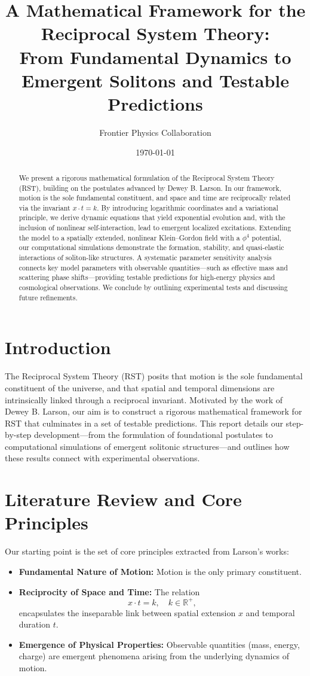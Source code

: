 \documentclass{article}
\title{A Mathematical Framework for the Reciprocal System Theory:\\ From Fundamental Dynamics to Emergent Solitons and Testable Predictions}
\author{Frontier Physics Collaboration}
\date{\today}
\begin{document}
\maketitle

\begin{abstract}
We present a rigorous mathematical formulation of the Reciprocal System Theory (RST), building on the postulates advanced by Dewey B. Larson. In our framework, motion is the sole fundamental constituent, and space and time are reciprocally related via the invariant \( x \cdot t = k \). By introducing logarithmic coordinates and a variational principle, we derive dynamic equations that yield exponential evolution and, with the inclusion of nonlinear self-interaction, lead to emergent localized excitations. Extending the model to a spatially extended, nonlinear Klein--Gordon field with a \(\phi^4\) potential, our computational simulations demonstrate the formation, stability, and quasi-elastic interactions of soliton-like structures. A systematic parameter sensitivity analysis connects key model parameters with observable quantities—such as effective mass and scattering phase shifts—providing testable predictions for high-energy physics and cosmological observations. We conclude by outlining experimental tests and discussing future refinements.
\end{abstract}

\tableofcontents

\section{Introduction}
The Reciprocal System Theory (RST) posits that motion is the sole fundamental constituent of the universe, and that spatial and temporal dimensions are intrinsically linked through a reciprocal invariant. Motivated by the work of Dewey B. Larson, our aim is to construct a rigorous mathematical framework for RST that culminates in a set of testable predictions. This report details our step-by-step development—from the formulation of foundational postulates to computational simulations of emergent solitonic structures—and outlines how these results connect with experimental observations.

\section{Literature Review and Core Principles}
Our starting point is the set of core principles extracted from Larson's works:
\begin{itemize}
    \item \textbf{Fundamental Nature of Motion:} Motion is the only primary constituent.
    \item \textbf{Reciprocity of Space and Time:} The relation
    \[
    x \cdot t = k,\quad k \in \mathbb{R}^+,
    \]
    encapsulates the inseparable link between spatial extension \(x\) and temporal duration \(t\).
    \item \textbf{Emergence of Physical Properties:} Observable quantities (mass, energy, charge) are emergent phenomena arising from the underlying dynamics of motion.
\end{itemize}
\end{document}
